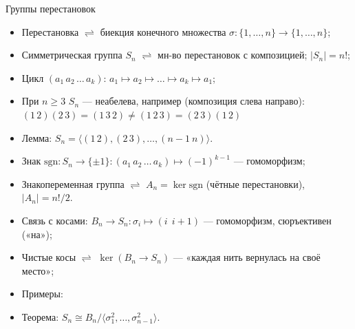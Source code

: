 \documentclass[serif, aspectratio=169]{beamer}
\begin{document}
\begin{frame}{Группы перестановок}
    \begin{itemize}
        \item Перестановка $\rightleftharpoons$ биекция конечного множества $\sigma:\{1,\dots,n\}\to\{1,\dots,n\}$;
        \item Симметрическая группа $S_n$ $\rightleftharpoons$ мн-во перестановок с композицией; $|S_n|=n!$;
        \item Цикл $(a_1\,a_2\,\dots\,a_k)$: $a_1\mapsto a_2\mapsto\dots\mapsto a_k\mapsto a_1$;
        \item При $n\ge3$ $S_n$ --- неабелева, например (композиция слева направо): $(1\,2)(2\,3)=(1\,3\,2)\ne(1\,2\,3)=(2\,3)(1\,2)$
        \item Лемма: $S_n=\langle(1\,2),(2\,3),\dots,(n{-}1\ n)\rangle$.
        \item Знак $\mathrm{sgn}: S_n\to\{\pm1\}: (a_1\,a_2\,\dots\,a_k) \mapsto (-1)^{k-1}$ --- гомоморфизм; 
        \item Знакопеременная группа $\rightleftharpoons$ $A_n=\ker\mathrm{sgn}$ (чётные перестановки), $|A_n|=n!/2$.
        \item Связь с косами: $B_n\to S_n: \sigma_i\mapsto(i\ \ i{+}1)$ --- гомоморфизм, сюръективен («на»);
        \item Чистые косы $\rightleftharpoons$ $\ker(B_n\to S_n)$ --- «каждая нить вернулась на своё место»; 
        \item Примеры:
        \begin{center}
        \end{center}
        \item Теорема: $S_n\cong B_n/\langle\sigma_1^2,\dots,\sigma_{n-1}^2\rangle$.
    \end{itemize}
    \note{
}
\end{frame}
\end{document}
